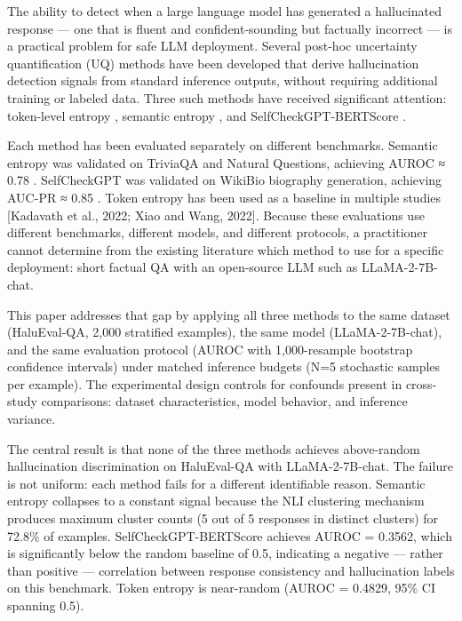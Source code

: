 
The ability to detect when a large language model has generated a hallucinated response — one that is fluent and confident-sounding but factually incorrect — is a practical problem for safe LLM deployment. Several post-hoc uncertainty quantification (UQ) methods have been developed that derive hallucination detection signals from standard inference outputs, without requiring additional training or labeled data. Three such methods have received significant attention: token-level entropy \citep{Kadavathetal2022}, semantic entropy \citep{Kuhnetal2023}, and SelfCheckGPT-BERTScore \citep{Manakuletal2023}.

Each method has been evaluated separately on different benchmarks. Semantic entropy was validated on TriviaQA and Natural Questions, achieving AUROC ≈ 0.78 \citep{Kuhnetal2023}. SelfCheckGPT was validated on WikiBio biography generation, achieving AUC-PR ≈ 0.85 \citep{Manakuletal2023}. Token entropy has been used as a baseline in multiple studies [Kadavath et al., 2022; Xiao and Wang, 2022]. Because these evaluations use different benchmarks, different models, and different protocols, a practitioner cannot determine from the existing literature which method to use for a specific deployment: short factual QA with an open-source LLM such as LLaMA-2-7B-chat.

This paper addresses that gap by applying all three methods to the same dataset (HaluEval-QA, 2,000 stratified examples), the same model (LLaMA-2-7B-chat), and the same evaluation protocol (AUROC with 1,000-resample bootstrap confidence intervals) under matched inference budgets (N=5 stochastic samples per example). The experimental design controls for confounds present in cross-study comparisons: dataset characteristics, model behavior, and inference variance.

The central result is that none of the three methods achieves above-random hallucination discrimination on HaluEval-QA with LLaMA-2-7B-chat. The failure is not uniform: each method fails for a different identifiable reason. Semantic entropy collapses to a constant signal because the NLI clustering mechanism produces maximum cluster counts (5 out of 5 responses in distinct clusters) for 72.8\% of examples. SelfCheckGPT-BERTScore achieves AUROC = 0.3562, which is significantly below the random baseline of 0.5, indicating a negative — rather than positive — correlation between response consistency and hallucination labels on this benchmark. Token entropy is near-random (AUROC = 0.4829, 95\% CI spanning 0.5).

